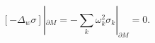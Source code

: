 \begin{equation}
\left[ -\Delta_w \sigma \right]|_{\partial M} =
-\sum_k \omega_k^2 \sigma_k |_{\partial M} =0.\label{1stterm}
\end{equation}

